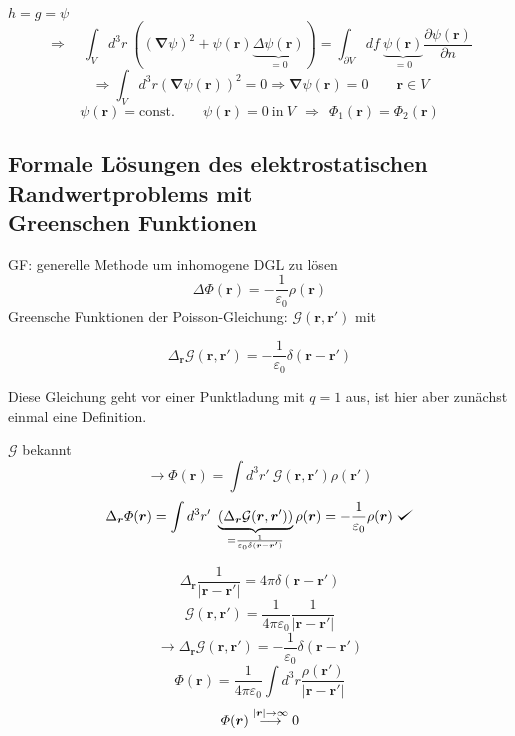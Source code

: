 \documentclass[titlepage,11pt,a4paper,ngerman]{report}
\def\checkmark{\tikz\fill[scale=0.4](0,.35) -- (.25,0) -- (1,.7) -- (.25,.15) -- cycle;}
\newcommand{\tx}[1]{\textrm{#1}}
\newcommand{\const}{\tx{const.}}
\newcommand{\gre}{\mathcal{G}}
\newcommand{\pofr}{\Phi(\vec{r})}
\renewcommand{\Phi}{\varPhi}
\renewcommand{\vec}[1]{\boldsymbol{#1}}
\newcommand{\lcom}[1]{\color{MidnightBlue}#1\color{black}}
\renewcommand{\epsilon}{\varepsilon}
\newcommand{\vabla}{\boldsymbol{\nabla}}
\newcommand{\frbox}[2]{\begin{tcolorbox}[colback=white,colframe=red!75!black,fonttitle=\bfseries,title=#1]#2\end{tcolorbox}}
\begin{document}
$h = g = \psi$
$$\Rightarrow \quad \int_V d^3 r\ ((\vabla \psi)^2 + \psi(\vec{r}) \underbrace{\Delta \psi(\vec{r})}_{=0}) = \int_{\partial V} df\ \underbrace{\psi(\vec{r})}_{=0} \frac{\partial \psi(\vec{r})}{\partial n} $$
\begin{equation*}
\Rightarrow \int_V d^3 r \left(\vec{\nabla} \psi(\vec{r}) \right)^2 = 0 \Rightarrow \vec{\nabla} \psi(\vec{r}) = 0 \qquad \vec{r} \in V
\end{equation*}
\begin{equation*}
\psi(\vec{r}) = \const \qquad \psi(\vec{r}) = 0 \ \tx{in} \ V \ \ \Rightarrow \ \ \Phi_1(\vec{r}) = \Phi_2(\vec{r})
\end{equation*}


\subsection{Formale Lösungen des elektrostatischen Randwertproblems mit \\ Greenschen Funktionen}
GF: generelle Methode um inhomogene DGL zu lösen
\begin{equation*}
\Delta \pofr = - \frac{1}{\epsilon_0} \rho(\vec{r})
\end{equation*}
Greensche Funktionen der Poisson-Gleichung: $ \gre(\vec{r},\vec{r}') $ mit
\frbox{Greensche Funktionen der Poisson-Gleichung}{\begin{equation*}
\Delta_{\vec{r}} \gre(\vec{r},\vec{r}') = - \frac{1}{\epsilon_0} \delta(\vec{r} - \vec{r}')
\end{equation*}}
\lcom{Diese Gleichung geht vor einer Punktladung mit $ q=1 $ aus, ist hier aber zunächst einmal eine Definition.}

$\mathcal G$ bekannt 
$$\rightarrow \pofr = \int d^3 r'\ \mathcal G(\vec{r}, \vec{r}') \rho(\vec{r}')$$
$$\Delta_{\vec{r}} \pofr = \int d^3 r'\ \underbrace{(\Delta_{\vec{r}} \mathcal G(\vec{r}, \vec{r}'))}_{= \frac{1}{\epsilon_0 \delta(\vec{r}-\vec{r}')}} \rho (\vec{r}) = - \frac{1}{\epsilon_0} \rho (\vec{r})\ \checkmark$$

\begin{equation*}
\Delta_{\vec{r}} \frac{1}{|\vec{r} - \vec{r}'|} = 4 \pi \delta(\vec{r} - \vec{r}')
\end{equation*}
\begin{equation*}
\gre(\vec{r},\vec{r}') = \frac{1}{4 \pi \epsilon_0} \frac{1}{|\vec{r} - \vec{r}'|}
\end{equation*}
\begin{equation*}
\rightarrow \Delta_{\vec{r}} \gre(\vec{r}, \vec{r}') = - \frac{1}{\epsilon_0} \delta(\vec{r} - \vec{r}')
\end{equation*}
\begin{equation*}
\pofr = \frac{1}{4 \pi \epsilon_0} \int d^3 r \frac{\rho(\vec{r}')}{|\vec{r} - \vec{r}'|}
\end{equation*}
\begin{equation*}
\pofr \buildrel |\vec{r}| \to \infty \over \longrightarrow 0
\end{equation*}
\end{document}
